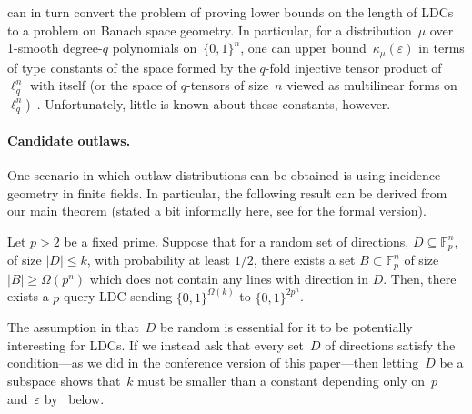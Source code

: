 \documentclass{toc}
\newcommand{\bset}[1]{\{0,1\}^{#1}} %
\newcommand{\eps}{\varepsilon}
\newcommand{\F}{{\mathbb{F}}}
\begin{document}
 can in turn convert the problem of proving lower bounds on the length of LDCs to a problem on Banach space geometry.
In particular, for a distribution~$\mu$ over 1-smooth degree-$q$ polynomials on~$\bset{n}$, one can upper bound~$\kappa_\mu(\eps)$ in terms of type constants of the space formed by the $q$-fold injective tensor product of~$\ell_q^n$ with itself (or the space of $q$-tensors of size~$n$ viewed as multilinear forms on~$\ell_q^n$)~\cite{Briet:2015}.
Unfortunately, little is known about these constants, however.

\medskip
\paragraph{Candidate outlaws.}
One scenario in which outlaw distributions can be obtained is using incidence geometry in finite fields. In particular, the  following result can be derived from our main theorem (stated a bit informally here, see  for the formal version).

\begin{corollary}\label{cor:lines_ldcs_informal}
Let $p>2$ be a fixed prime. Suppose that for a random set of directions, $D\subseteq \F_p^{n}$, %
  of size $|D|\le k$, with probability at least $1/2$, there exists a set $B\subset \F_p^n$  of size $|B|\ge \Omega(p^n)$ which does not contain any lines with direction in $D$.
Then, there exists a $p$-query LDC sending $\bset{\Omega(k)}$ to $\bset{2p^n}$. 
\end{corollary}

The assumption in  that~$D$ be random is essential for it to be potentially interesting for LDCs.
If we instead ask that every set~$D$ of directions %
 satisfy the condition---as we did in the conference version of this paper---then letting~$D$ be a subspace shows that~$k$ must be smaller than a constant depending only on~$p$ and~$\eps$ by~ below.
\end{document}
